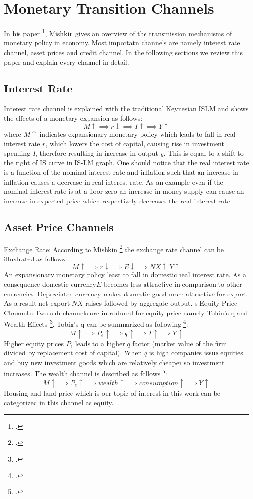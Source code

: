 \newpage
\section{Monetary Transition Channels} \label{MonetaryTransitionChannels}
In his paper \footcite[See.][]{Mishkin1996}, Mishkin gives an overview of the transmission mechanisms of monetary policy in economy. Most importatn channels are namely interest rate channel, asset prices and credit channel. In the following sections we review this paper and explain every channel in detail. 

\subsection{Interest Rate}
Interest rate channel is explained with the traditional Keynesian \ac{ISLM} and shows the effects of a monetary expansion as follows:
  \[M \uparrow \implies r \downarrow \implies I \uparrow \implies Y \uparrow\]
where $ M \uparrow $ indicates expansionary monetary policy which leads to fall in real interest rate $r$, which lowers the cost of capital, causing rise in investment spending $I$, therefore resulting in increase in output $y$.
This is equal to a shift to the right of IS curve in IS-LM graph. One should notice that the real interest rate is a function of the nominal interest rate and inflation such that an increase in inflation causes a decrease in real interest rate. As an example even if the nominal interest rate is at a floor zero an increase in money supply can cause an increase in expected price which respectively decreases the real interest rate.

\subsection{Asset Price Channels}
Exchange Rate:
According to Mishkin \footcite[See.][]{Mishkin1996} the exchange rate channel can be illustrated as follows:
 \[M \uparrow \implies r \downarrow \implies E \downarrow \implies NX \uparrow\ Y \uparrow\]
An expansionary monetary policy least to fall in domestic real interest rate. As a consequence domestic currency$E$  becomes less attractive in comparison to other currencies. Depreciated currency makes domestic good more attractive for export. As a result net export $NX$ raises followed by aggregate output. s
Equity Price Channels:
 Two sub-channels are introduced for equity price namely Tobin's q and Wealth Effects \footcite[See.][]{Mishkin1996}. 
Tobin's q can be summarized as following \footcite[See.][]{Mishkin1996}: 
 \[M \uparrow \implies P_e \uparrow \implies q \uparrow \implies I \uparrow \implies Y \uparrow\]
Higher equity prices $P_e$ leads to a higher $q$ factor (market value of the firm divided by replacement cost of capital). When $q$ is high companies issue equities and buy new investment goods which are relatively cheaper so investment increases. 
The wealth channel is described as follows \footcite[See.][]{Mishkin1996}: 
\[M \uparrow \implies P_e \uparrow \implies wealth \uparrow \implies consumption \uparrow \implies Y \uparrow\]
Housing and land price which is our topic of interest in this work can be categorized in this channel as equity.

